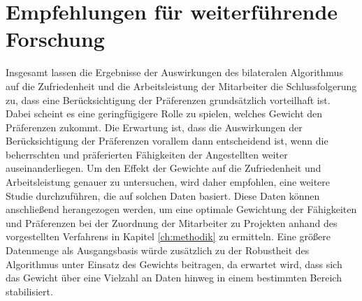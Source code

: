 \section{Empfehlungen für weiterführende Forschung}
Insgesamt lassen die Ergebnisse der Auswirkungen des bilateralen Algorithmus auf die Zufriedenheit und die Arbeitsleistung der Mitarbeiter die Schlussfolgerung zu, dass eine Berücksichtigung der Präferenzen grundsätzlich vorteilhaft ist.
Dabei scheint es eine geringfügigere Rolle zu spielen, welches Gewicht den Präferenzen zukommt.
Die Erwartung ist, dass die Auswirkungen der Berücksichtigung der Präferenzen vorallem dann entscheidend ist, wenn die beherrschten und präferierten Fähigkeiten der Angestellten weiter auseinanderliegen.
Um den Effekt der Gewichte auf die Zufriedenheit und Arbeitsleistung genauer zu untersuchen, wird daher empfohlen, eine weitere Studie durchzuführen, die auf solchen Daten basiert.
Diese Daten können anschließend herangezogen werden, um eine optimale Gewichtung der Fähigkeiten und Präferenzen bei der Zuordnung der Mitarbeiter zu Projekten anhand des vorgestellten Verfahrens in Kapitel \ref{ch:methodik} zu ermitteln.
Eine größere Datenmenge als Ausgangsbasis würde zusätzlich zu der Robustheit des Algorithmus unter Einsatz des Gewichts beitragen, da erwartet wird, dass sich das Gewicht über eine Vielzahl an Daten hinweg in einem bestimmten Bereich stabilisiert.


